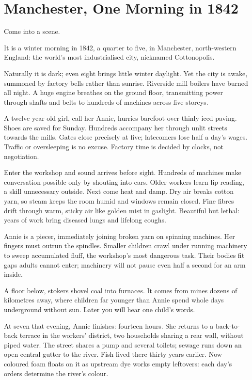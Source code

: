 \section{Manchester, One Morning in 1842}
Come into a scene.

It is a winter morning in 1842, a quarter to five, in Manchester, north-western England: the world's most industrialised city, nicknamed Cottonopolis.

Naturally it is dark; even eight brings little winter daylight. Yet the city is awake, summoned by factory bells rather than sunrise. Riverside mill boilers have burned all night. A huge engine breathes on the ground floor, transmitting power through shafts and belts to hundreds of machines across five storeys.

A twelve-year-old girl, call her Annie, hurries barefoot over thinly iced paving. Shoes are saved for Sunday. Hundreds accompany her through unlit streets towards the mills. Gates close precisely at five; latecomers lose half a day's wages. Traffic or oversleeping is no excuse. Factory time is decided by clocks, not negotiation.

Enter the workshop and sound arrives before sight. Hundreds of machines make conversation possible only by shouting into ears. Older workers learn lip-reading, a skill unnecessary outside. Next come heat and damp. Dry air breaks cotton yarn, so steam keeps the room humid and windows remain closed. Fine fibres drift through warm, sticky air like golden mist in gaslight. Beautiful but lethal: years of work bring diseased lungs and lifelong coughs.

Annie is a piecer, immediately joining broken yarn on spinning machines. Her fingers must outrun the spindles. Smaller children crawl under running machinery to sweep accumulated fluff, the workshop's most dangerous task. Their bodies fit gaps adults cannot enter; machinery will not pause even half a second for an arm inside.

A floor below, stokers shovel coal into furnaces. It comes from mines dozens of kilometres away, where children far younger than Annie spend whole days underground without sun. Later you will hear one child's words.

At seven that evening, Annie finishes: fourteen hours. She returns to a back-to-back terrace in the workers' district, two households sharing a rear wall, without piped water. The street shares a pump and several toilets; sewage runs down an open central gutter to the river. Fish lived there thirty years earlier. Now coloured foam floats on it as upstream dye works empty leftovers: each day's orders determine the river's colour.

